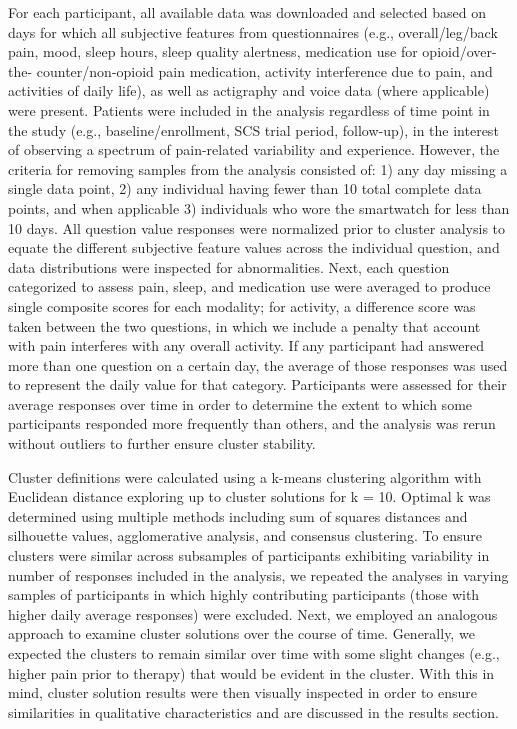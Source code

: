 \documentclass[conference]{IEEEtran}
\begin{document}
For each participant, all available data was downloaded and selected based on days for which all subjective features from questionnaires (e.g., overall/leg/back pain, mood, sleep hours, sleep quality alertness, medication use for opioid/over-the- counter/non-opioid pain medication, activity interference due to pain, and activities of daily life), as well as actigraphy and voice data (where applicable) were present. Patients were included in the analysis regardless of time point in the study (e.g., baseline/enrollment, SCS trial period, follow-up), in the interest of observing a spectrum of pain-related variability and experience. However, the criteria for removing samples from the analysis consisted of: 1) any day missing a single data point, 2) any individual having fewer than 10 total complete data points, and when applicable 3) individuals who wore the smartwatch for less than 10 days. All question value responses were normalized prior to cluster analysis to equate the different subjective feature values across the individual question, and data distributions were inspected for abnormalities. Next, each question categorized to assess pain, sleep, and medication use were averaged to produce single composite scores for each modality; for activity, a difference score was taken between the two questions, in which we include a penalty that account with pain interferes with any overall activity. If any participant had answered more than one question on a certain day, the average of those responses was used to represent the daily value for that category. Participants were assessed for their average responses over time in order to determine the extent to which some participants responded more frequently than others, and the analysis was rerun without outliers to further ensure cluster stability.

Cluster definitions were calculated using a k-means clustering algorithm with Euclidean distance exploring up to cluster solutions for k = 10. Optimal k was determined using multiple methods including sum of squares distances and silhouette values, agglomerative analysis, and consensus clustering. To ensure clusters were similar across subsamples of participants exhibiting variability in number of responses included in the analysis, we repeated the analyses in varying samples of participants in which highly contributing participants (those with higher daily average responses) were excluded. Next, we employed an analogous approach to examine cluster solutions over the course of time. Generally, we expected the clusters to remain similar over time with some slight changes (e.g., higher pain prior to therapy) that would be evident in the cluster. With this in mind, cluster solution results were then visually inspected in order to ensure similarities in qualitative characteristics and are discussed in the results section.
\end{document}
